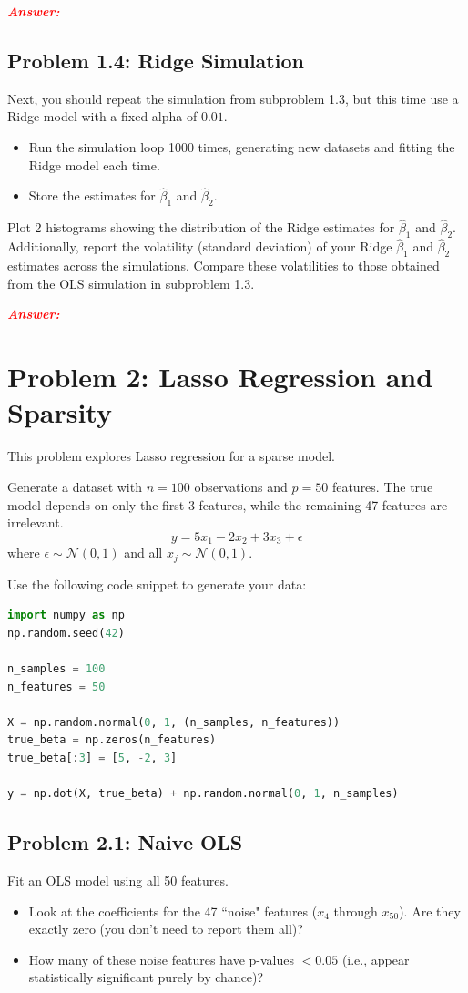 \documentclass[11pt, letterpaper]{article}
\newcommand{\problem}[1]{\section*{Problem #1}}
\newcommand{\subproblem}[1]{\subsection*{Problem #1}}
\newcommand{\answer}{\textbf{\textit{\textcolor{red}{Answer:}}}\\}
\begin{document}
\answer

\subproblem{1.4: Ridge Simulation}
Next, you should repeat the simulation from subproblem 1.3, but this time use a Ridge model with a fixed alpha of $0.01$.
\begin{itemize}
    \item Run the simulation loop 1000 times, generating new datasets and fitting the Ridge model each time.
    \item Store the estimates for $\hat{\beta}_1$ and $\hat{\beta}_2$.
\end{itemize}
Plot 2 histograms showing the distribution of the Ridge estimates for $\hat{\beta}_1$ and $\hat{\beta}_2$.
Additionally, report the volatility (standard deviation) of your Ridge $\hat{\beta}_1$ and $\hat{\beta}_2$ estimates across the simulations.
Compare these volatilities to those obtained from the OLS simulation in subproblem 1.3.

\answer

\problem{2: Lasso Regression and Sparsity}

This problem explores Lasso regression for a sparse model.

Generate a dataset with $n=100$ observations and $p=50$ features. 
The true model depends on only the first 3 features, while the remaining 47 features are irrelevant.
$$ y = 5x_1 - 2x_2 + 3x_3 + \epsilon $$
where $\epsilon \sim \mathcal{N}(0, 1)$ and all $x_j \sim \mathcal{N}(0, 1)$.

Use the following code snippet to generate your data:
    \begin{lstlisting}[language=Python]
import numpy as np
np.random.seed(42)

n_samples = 100
n_features = 50

X = np.random.normal(0, 1, (n_samples, n_features))
true_beta = np.zeros(n_features)
true_beta[:3] = [5, -2, 3]

y = np.dot(X, true_beta) + np.random.normal(0, 1, n_samples)\end{lstlisting}

\subproblem{2.1: Naive OLS}
Fit an OLS model using all 50 features.
\begin{itemize}
    \item Look at the coefficients for the 47 ``noise" features ($x_4$ through $x_{50}$). Are they exactly zero (you don't need to report them all)?
    \item How many of these noise features have p-values $< 0.05$ (i.e., appear statistically significant purely by chance)?
\end{itemize}
\end{document}
